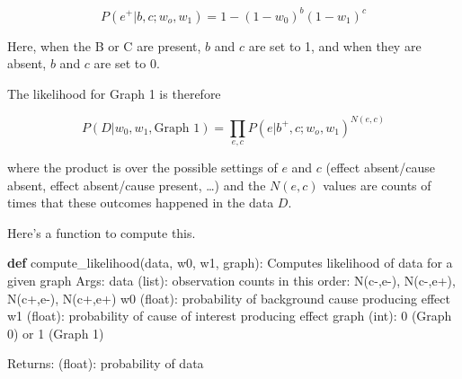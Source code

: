 \documentclass[
  letterpaper,
  DIV=11,
  numbers=noendperiod]{scrreprt}
\newenvironment{Shaded}{\begin{snugshade}}{\end{snugshade}}
\newcommand{\CommentTok}[1]{\textcolor[rgb]{0.37,0.37,0.37}{#1}}
\newcommand{\KeywordTok}[1]{\textcolor[rgb]{0.00,0.23,0.31}{\textbf{#1}}}
\newcommand{\NormalTok}[1]{\textcolor[rgb]{0.00,0.23,0.31}{#1}}
\begin{document}
\[
P(e^+|b,c; w_o, w_1) = 1 - (1-w_0)^b (1-w_1)^c
\]

Here, when the B or C are present, \(b\) and \(c\) are set to 1, and
when they are absent, \(b\) and \(c\) are set to 0.

The likelihood for Graph 1 is therefore

\[
P(D | w_0, w_1, \text{Graph } 1) = \prod_{e,c} P(e|b^+,c; w_o, w_1)^{N(e,c)}
\]

where the product is over the possible settings of \(e\) and \(c\)
(effect absent/cause absent, effect absent/cause present, \ldots) and
the \(N(e,c)\) values are counts of times that these outcomes happened
in the data \(D\).

Here's a function to compute this.

\begin{Shaded}
\begin{Highlighting}[]
\KeywordTok{def}\NormalTok{ compute\_likelihood(data, w0, w1, graph):}
  \CommentTok{\textquotesingle{}\textquotesingle{}\textquotesingle{}}
\CommentTok{  Computes likelihood of data for a given graph}
\CommentTok{     }
\CommentTok{  Args:}
\CommentTok{    data (list): observation counts in this order:}
\CommentTok{      N(c{-},e{-}), N(c{-},e+), N(c+,e{-}), N(c+,e+)}
\CommentTok{    w0 (float): probability of background cause producing effect}
\CommentTok{    w1 (float): probability of cause of interest producing effect}
\CommentTok{      graph (int): 0 (Graph 0) or 1 (Graph 1)}

\CommentTok{    Returns:}
\CommentTok{      (float): probability of data }
\CommentTok{  \textquotesingle{}\textquotesingle{}\textquotesingle{}}
  

\end{Highlighting}
\end{Shaded}
\end{document}
